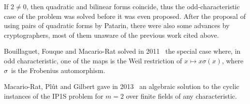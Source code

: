 \documentclass{lms}
\def\F{\mathbb{F}}
\begin{document}
% 
If $2 ≠ 0$, then quadratic and bilinear forms coincide,
thus the odd-characteristic case of the problem
was solved before it was even proposed.
After the proposal of using pairs of quadratic forms by Patarin,
there were also some advances by cryptographers,
most of them unaware of the previous work cited above.

Bouillaguet, Fouque and Macario-Rat solved
in 2011~\cite{DBLP:conf/asiacrypt/BouillaguetFM11}
the special case where, in odd characteristic,
one of the maps is the Weil restriction of $x ↦ x σ(x)$,
where $σ$~is the Frobenius automorphism.

Macario-Rat, Plût and Gilbert gave in 2013~\cite{MPG2013}
an algebraic solution to the cyclic instances of the IP1S problem
for $m=2$ over finite fields of any characteristic.
\end{document}
